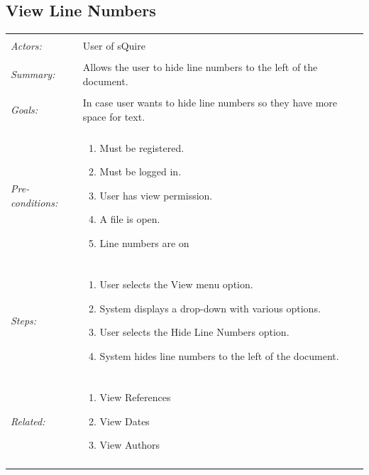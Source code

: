 \documentclass[11pt]{report}
\begin{document}
\subsection{View Line Numbers }
\begin{tabular}{ p{2cm} p{12cm} }
\hline
\\
	\textit{Actors:} & User of sQuire \\
	\\
	\textit{Summary:} & Allows the user to hide line numbers to the left of the document. \\
	\\
	\textit{Goals:} & In case user wants to hide line numbers so they have more space for text.\\
	\\
	\textit{Pre-conditions:} & \begin{enumerate}
		\item Must be registered.
		\item Must be logged in.
		\item User has view permission.
		\item A file is open.
		\item Line numbers are on
	\end{enumerate} \\
	\\
	\textit{Steps:} & \begin{enumerate}
		\item User selects the View menu option.
		\item System displays a drop-down with various options.
		\item User selects the Hide Line Numbers option.
		\item System hides line numbers to the left of the document.
	\end{enumerate} \\
	\\
	\textit{Related:} & \begin{enumerate}
		\item View References
		\item View Dates
		\item View Authors
	\end{enumerate} \\
	\\
\hline
\end{tabular}
\newpage
\end{document}
